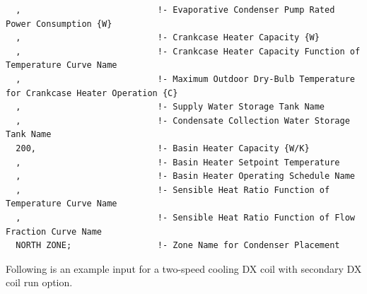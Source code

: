 \begin{lstlisting}
  ,                           !- Evaporative Condenser Pump Rated Power Consumption {W}
  ,                           !- Crankcase Heater Capacity {W}
  ,                           !- Crankcase Heater Capacity Function of Temperature Curve Name
  ,                           !- Maximum Outdoor Dry-Bulb Temperature for Crankcase Heater Operation {C}
  ,                           !- Supply Water Storage Tank Name
  ,                           !- Condensate Collection Water Storage Tank Name
  200,                        !- Basin Heater Capacity {W/K}
  ,                           !- Basin Heater Setpoint Temperature
  ,                           !- Basin Heater Operating Schedule Name
  ,                           !- Sensible Heat Ratio Function of Temperature Curve Name
  ,                           !- Sensible Heat Ratio Function of Flow Fraction Curve Name
  NORTH ZONE;                 !- Zone Name for Condenser Placement
\end{lstlisting}

Following is an example input for a two-speed cooling DX coil with secondary DX coil run option.

